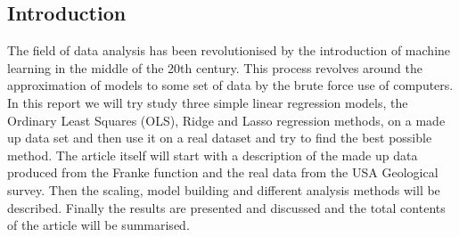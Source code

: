 \documentclass[11pt, A4paper, english]{article}
\begin{document}
	
	\begin{multicols}{2}
		\section{Introduction}
The field of data analysis has been revolutionised by the introduction of machine learning in the middle of the 20th century. This process revolves around the approximation of models to some set of data by the brute force use of computers. In this report we will try study three simple linear regression models, the Ordinary Least Squares (OLS), Ridge and Lasso regression methods, on a made up data set and then use it on a real dataset and try to find the best possible method. The article itself will start with a description of the made up data produced from the Franke function and the real data from the USA Geological survey. Then the scaling, model building and different analysis methods will be described. Finally the results are presented and discussed and the total contents of the article will be summarised.
		

\end{multicols}
\end{document}
